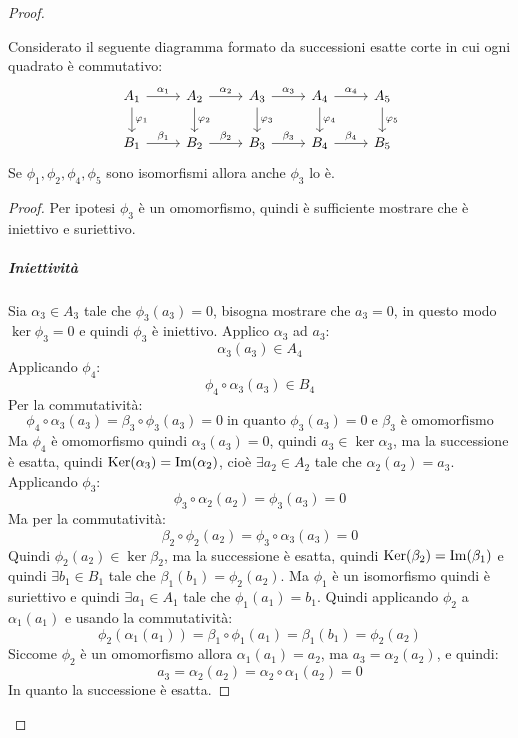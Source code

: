 \begin{proof}
  \begin{lemma}
    Considerato il seguente diagramma formato da successioni esatte corte in cui ogni quadrato è commutativo:
    \[
      \begin{tikzcd}
        A_1 \rar{\alpha_1} \dar{\phi_1} & A_2 \rar{\alpha_2} \dar{\phi_2} & A_3 \rar{\alpha_3} \dar{\phi_3} & A_4 \rar{\alpha_4} \dar{\phi_4} & A_5 \dar{\phi_5} \\
        B_1 \rar{\beta_1} & B_2 \rar{\beta_2} & B_3 \rar{\beta_3} & B_4 \rar{\beta_4} & B_5
      \end{tikzcd}
    \]
    Se $ \phi_1, \phi_2, \phi_4, \phi_5 $ sono isomorfismi allora anche $ \phi_3 $ lo è.
  \end{lemma}
  \begin{proof}
    Per ipotesi $ \phi_3 $ è un omomorfismo, quindi è sufficiente mostrare che è iniettivo e suriettivo.

    \subparagraph{Iniettività} Sia $ \alpha_3 \in A_3 $ tale che $ \phi_3(a_3) = 0 $, bisogna mostrare che $ a_3 = 0 $,
    in questo modo $ \ker{\phi_3} = 0 $ e quindi $ \phi_3 $ è iniettivo.
    Applico $ \alpha_3 $ ad $ a_3 $:
    \[
      \alpha_3(a_3) \in A_4
    \]
    Applicando $ \phi_4 $:
    \[
      \phi_4 \circ \alpha_3 (a_3) \in B_4
    \]
    Per la commutatività:
    \[
      \phi_4 \circ \alpha_3 (a_3) = \beta_3 \circ \phi_3 (a_3) = 0 \;\text{in quanto } \phi_3 (a_3) = 0 \; \text{e } \beta_3 \text{ è omomorfismo}
    \]
    Ma $ \phi_4 $ è omomorfismo quindi $ \alpha_3(a_3) = 0 $, quindi $ a_3 \in \ker{\alpha_3} $, ma la successione è
    esatta, quindi $ \mathrm{Ker}( \alpha_3) = \mathrm{Im}( \alpha_2 ) $, cioè $ \exists a_2 \in A_2 $ tale che $ \alpha_2(a_2) = a_3 $.
    Applicando $ \phi_3 $:
    \[
      \phi_3 \circ \alpha_2(a_2) = \phi_3(a_3) = 0
    \]
    Ma per la commutatività:
    \[
      \beta_2 \circ \phi_2 (a_2) = \phi_3 \circ \alpha_3 (a_3) = 0
    \]
    Quindi $ \phi_2(a_2) \in \ker{\beta_2} $, ma la successione è esatta, quindi
    $ \mathrm{Ker}( \beta_2) = \mathrm{Im}( \beta_1 ) $ e quindi $ \exists b_1 \in B_1 $ tale che
    $ \beta_1(b_1) = \phi_2(a_2) $. Ma $ \phi_1 $ è un isomorfismo quindi è suriettivo e
    quindi $ \exists a_1 \in A_1 $ tale che $ \phi_1(a_1) = b_1 $. Quindi applicando
    $ \phi_2 $ a $ \alpha_1(a_1) $ e usando la commutatività:
    \[
      \phi_2 (\alpha_1 (a_1)) = \beta_1 \circ \phi_1(a_1) = \beta_1(b_1) = \phi_2(a_2)
    \]
    Siccome $ \phi_2 $ è un omomorfismo allora $ \alpha_1(a_1) = a_2 $, ma $ a_3 = \alpha_2(a_2) $,
    e quindi:
    \[
      a_3 = \alpha_2(a_2) = \alpha_2 \circ \alpha_1 (a_2) = 0
    \]
    In quanto la successione è esatta.


\end{proof}
\end{proof}
